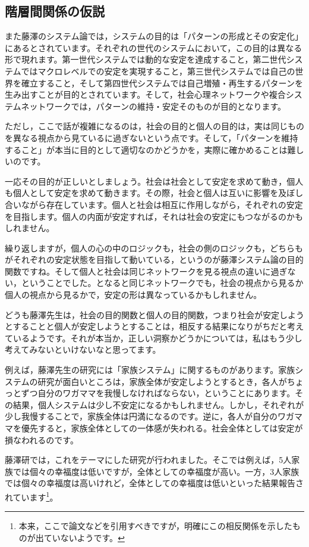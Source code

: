 \documentclass{ltjsbook}
\begin{document}
\subsection{階層間関係の仮説}

また藤澤のシステム論では，システムの目的は「パターンの形成とその安定化」にあるとされています。それぞれの世代のシステムにおいて，この目的は異なる形で現れます。第一世代システムでは動的な安定を達成すること，第二世代システムではマクロレベルでの安定を実現すること，第三世代システムでは自己の世界を確立すること，そして第四世代システムでは自己増殖・再生するパターンを生み出すことが目的とされています。そして，社会心理ネットワークや複合システムネットワークでは，パターンの維持・安定そのものが目的となります。

ただし，ここで話が複雑になるのは，社会の目的と個人の目的は，実は同じものを異なる視点から見ているに過ぎないという点です。そして，「パターンを維持すること」が本当に目的として適切なのかどうかを，実際に確かめることは難しいのです。

一応その目的が正しいとしましょう。社会は社会として安定を求めて動き，個人も個人として安定を求めて動きます。その際，社会と個人は互いに影響を及ぼし合いながら存在しています。個人と社会は相互に作用しながら，それぞれの安定を目指します。個人の内面が安定すれば，それは社会の安定にもつながるのかもしれません。

繰り返しますが，個人の心の中のロジックも，社会の側のロジックも，どちらもがそれぞれの安定状態を目指して動いている，というのが藤澤システム論の目的関数ですね。そして個人と社会は同じネットワークを見る視点の違いに過ぎない，ということでした。となると同じネットワークでも，社会の視点から見るか個人の視点から見るかで，安定の形は異なっているかもしれません。

どうも藤澤先生は，社会の目的関数と個人の目的関数，つまり社会が安定しようとすることと個人が安定しようとすることは，相反する結果になりがちだと考えているようです。それが本当か，正しい洞察かどうかについては，私はもう少し考えてみないといけないなと思ってます。

例えば，藤澤先生の研究には「家族システム」に関するものがあります。家族システムの研究が面白いところは，家族全体が安定しようとするとき，各人がちょっとずつ自分のワガママを我慢しなければならない，ということにあります。その結果，個人システムは少し不安定になるかもしれません。しかし，それぞれが少し我慢することで，家族全体は円満になるのです。逆に，各人が自分のワガママを優先すると，家族全体としての一体感が失われる。社会全体としては安定が損なわれるのです。

藤澤研では，これをテーマにした研究が行われました。そこでは例えば，5人家族では個々の幸福度は低いですが，全体としての幸福度が高い。一方，3人家族では個々の幸福度は高いけれど，全体としての幸福度は低いといった結果報告されています\footnote{本来，ここで論文などを引用すべきですが，明確にこの相反関係を示したものが出ていないようです。}。
\end{document}
